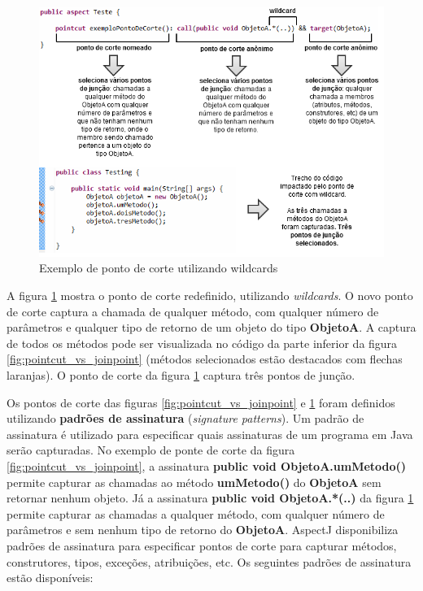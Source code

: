 \begin{figure}
	\centering
	\includegraphics{img/pointcut_vs_joinpoint_wildcard.png}
	\caption{Exemplo de ponto de corte utilizando wildcards}\label{fig:pointcut_vs_joinpoint_wildcard}
\end{figure}

A figura \ref{fig:pointcut_vs_joinpoint_wildcard} mostra o ponto de corte redefinido, utilizando \textit{wildcards}. 
O novo ponto de corte captura a chamada de qualquer método, com qualquer número
de parâmetros e qualquer tipo de retorno de um objeto do tipo \textbf{ObjetoA}.
A captura de todos os métodos pode ser visualizada no código da parte inferior
da figura \ref{fig:pointcut_vs_joinpoint} (métodos selecionados estão destacados
com flechas laranjas). O ponto de corte da figura \ref{fig:pointcut_vs_joinpoint_wildcard} captura três pontos de junção.

Os pontos de corte das figuras \ref{fig:pointcut_vs_joinpoint} e \ref{fig:pointcut_vs_joinpoint_wildcard} foram definidos utilizando \textbf{padrões
de assinatura} (\textit{signature patterns}). Um padrão de assinatura é utilizado para especificar quais assinaturas de um programa em Java serão capturadas. No
exemplo de ponte de corte da figura \ref{fig:pointcut_vs_joinpoint}, a assinatura \textbf{public void ObjetoA.umMetodo()} permite capturar as chamadas
ao método \textbf{umMetodo()} do \textbf{ObjetoA} sem retornar nenhum objeto. Já a assinatura \textbf{public void ObjetoA.*(..)} da 
figura \ref{fig:pointcut_vs_joinpoint_wildcard} permite capturar as chamadas a qualquer método, com qualquer número de parâmetros e sem nenhum
tipo de retorno do \textbf{ObjetoA}. AspectJ disponibiliza padrões de assinatura para especificar pontos de corte para capturar métodos, construtores,
tipos, exceções, atribuições, etc. Os seguintes padrões de assinatura estão disponíveis:


